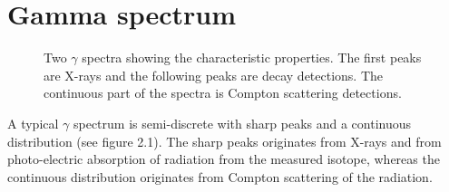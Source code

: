 \documentclass[12pt]{report}
\begin{document}
\section{Gamma spectrum}
\begin{figure}[ht]
    \centering
    
    
    
    \caption{Two $\gamma$ spectra showing the characteristic properties. The first peaks are X-rays and the following peaks are decay detections. The continuous part of the spectra is Compton scattering detections.}
    
\end{figure}
A typical $\gamma$ spectrum is semi-discrete with sharp peaks and a continuous distribution (see figure 2.1). The sharp peaks originates from X-rays and from photo-electric absorption of radiation from the measured isotope, whereas the continuous distribution originates from Compton scattering of the radiation.
\end{document}
